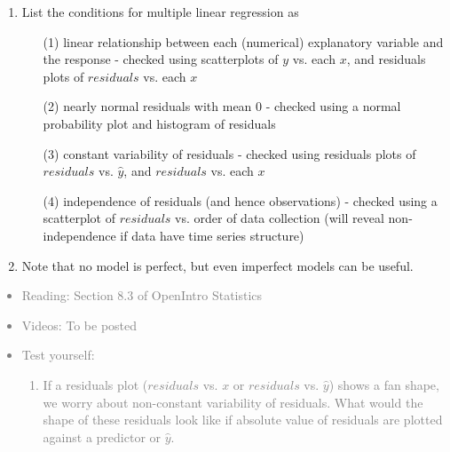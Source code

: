 \documentclass[11pt]{article}
\newcommand{\gray}[1]{\textcolor{gray}{#1}}
\begin{document}
%

\vspace{0.48cm}

%
\begin{enumerate}[resume]
\renewcommand\labelenumi{\textcolor{light}{\textbf{LO \theenumi.}}}

\item List the conditions for multiple linear regression as
\begin{enumerate}
\item[(1)] linear relationship between each (numerical) explanatory variable and the response - checked using scatterplots of $y$ vs. each $x$, and residuals plots of $residuals$ vs. each $x$
\item[(2)] nearly normal residuals with mean 0 - checked using a normal probability plot and histogram of residuals
\item[(3)] constant variability of residuals - checked using residuals plots of $residuals$ vs. $\hat{y}$, and $residuals$ vs. each $x$
\item[(4)] independence of residuals (and hence observations) - checked using a scatterplot of $residuals$ vs. order of data collection (will reveal non-independence if data have time series structure)
\end{enumerate}

\item Note that no model is perfect, but even imperfect models can be useful.

\end{enumerate}

\gray{
{\it
\vspace{-0.55cm}
\begin{itemize}
\renewcommand{\labelitemi}{{\textcolor{dark}{$\ast$}}}
\item Reading: Section 8.3 of OpenIntro Statistics
\item Videos: To be posted
\item Test yourself:
\begin{enumerate}
\item If a residuals plot ($residuals$ vs. $x$ or $residuals$ vs. $\hat{y}$) shows a fan shape, we worry about non-constant variability of residuals. What would the shape of these residuals look like if absolute value of residuals are plotted against a predictor or $\hat{y}$.
\end{enumerate}
\end{itemize}
}}
\end{document}
